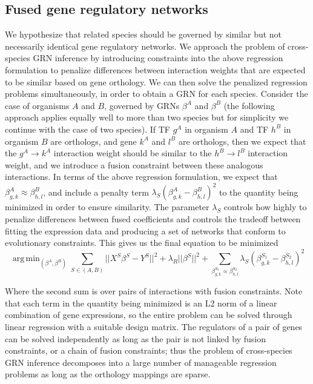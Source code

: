 \documentclass[11pt]{article}
\DeclareMathOperator*{\argmin}{arg\,min}
\begin{document}
\subsection{Fused gene regulatory networks}
We hypothesize that related species should be governed by similar but not necessarily identical gene regulatory networks. We approach the problem of cross-species GRN inference by introducing constraints into the above regression formulation to penalize differences between interaction weights that are expected to be similar based on gene orthology. We can then solve the penalized regression problems simultaneously, in order to obtain a GRN for each species. Consider the case of organisms $A$ and $B$, governed by GRNs $\beta^A$ and $\beta^B$ (the following approach applies equally well to more than two species but for simplicity we continue with the case of two species). If TF $g^A$ in organism $A$ and TF $h^B$ in organism $B$ are orthologs, and gene $k^A$ and $l^B$ are orthologs, then we expect that the $g^A \rightarrow k^A$ interaction weight should be similar to the $h^B \rightarrow l^B$ interaction weight, and we introduce a fusion constraint between these analogous interactions. In terms of the above regression formulation, we expect that $\beta^A_{g,k} \approx \beta^B_{h,l}$, and include a penalty term $\lambda_S(\beta^A_{g,k} - \beta^B_{h,l})^2$ to the quantity being minimized in order to ensure similarity. The parameter $\lambda_S$ controls how highly to penalize differences between fused coefficients and controls the tradeoff between fitting the expression data and producing a set of networks that conform to evolutionary constraints. This gives us the final equation to be minimized 
\begin{equation}
\argmin_{(\beta^A, \beta^B)} \displaystyle\sum_{S \in (A, B)} \vert \vert X^S\beta^S - Y^S \vert \vert ^2 + \lambda_R \vert \vert \beta^S \vert \vert ^2 + \displaystyle \sum_{\beta^{S_1}_{g,k} \approx \beta^{S_2}_{h,l}} \lambda_S(\beta^{S_1}_{g,k} - \beta^{S_2}_{h,l})^2
\end{equation}

Where the second sum is over pairs of interactions with fusion constraints. Note that each term in the quantity being minimized is an L2 norm of a linear combination of gene expressions, so the entire problem can be solved through linear regression with a suitable design matrix. The regulators of a pair of genes can be solved independently as long as the pair is not linked by fusion constraints, or a chain of fusion constraints; thus the problem of cross-species GRN inference decomposes into a large number of manageable regression problems as long as the orthology mappings are sparse.
\end{document}
